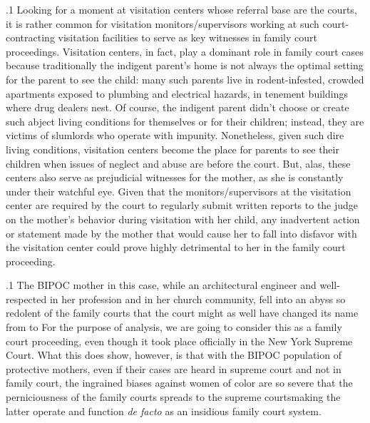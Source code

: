 \documentclass[11pt, twoside]{article}
\begin{document}
{\p.1{%
Looking for a moment at visitation centers whose referral base are the
courts, it is rather common for visitation monitors/supervisors working
at such court-contracting visitation facilities to serve as key witnesses
in family court proceedings. Visitation centers, in fact, play a dominant role in family court cases because traditionally the indigent parent’s
home is not always the optimal setting for the parent to see the child:
many such parents live in rodent-infested, crowded apartments exposed
to plumbing and electrical hazards, in tenement buildings where drug
dealers nest. Of course, the indigent parent didn’t choose or create such
abject living conditions for themselves or for their children; instead,
they are victims of slumlords who operate with impunity. Nonetheless,
given such dire living conditions, visitation centers become the  place for parents to see their children when issues of neglect and
abuse are before the court. But, alas, these centers also serve as prejudicial witnesses for the mother, as she is constantly under their watchful
eye. Given that the monitors/supervisors at the visitation center are required by the court to regularly submit written reports to the judge on
the mother’s behavior during visitation with her child, any inadvertent
action or statement made by the mother that would cause her to fall into
disfavor with the visitation center could prove highly detrimental to her
in the family court proceeding.
}%

\p.1{%
The BIPOC mother in this case, while an architectural engineer and
well-respected in her profession and in her church community, fell into
an abyss so redolent of the family courts that the court might as well
have changed its name from  to  For
the purpose of analysis, we are going to consider this as a 
family court proceeding, even though it took place officially in the New
York Supreme Court. What this does show, however, is that with the
BIPOC population of protective mothers, even if their cases are heard
in supreme court and not in family court, the ingrained biases against
women of color are so severe that the perniciousness of the family courts
spreads to the supreme courts\mdash{}making the latter operate and function
\textit{de facto} as an insidious family court system.
}%

}
\end{document}
